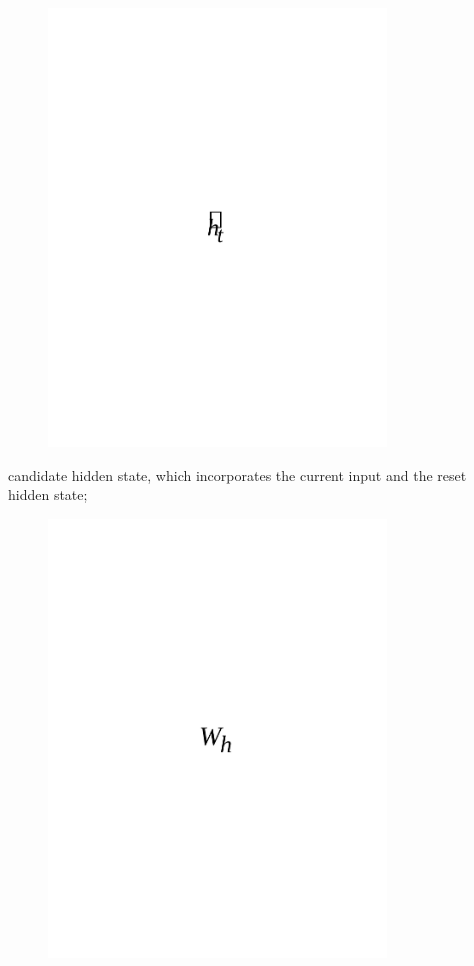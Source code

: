 \begin{figure}[H]
	\centering
	\includegraphics[width=0.8\textwidth]{media/ict/image72}
	\caption*{}
\end{figure}

candidate hidden state, which incorporates the current input and the
reset hidden state;
\begin{figure}[H]
	\centering
	\includegraphics[width=0.8\textwidth]{media/ict/image73}
	\caption*{}
\end{figure}

